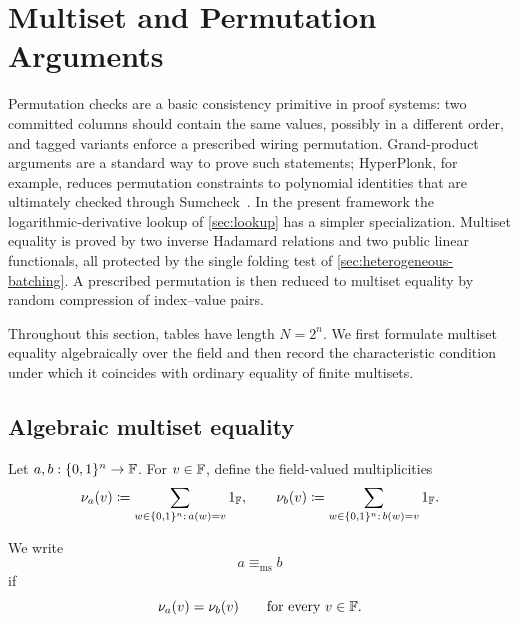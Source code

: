 \section{Multiset and Permutation Arguments}
\label{sec:permutation}

Permutation checks are a basic consistency primitive in proof systems: two committed columns should contain the same values, possibly in a different order, and tagged variants enforce a prescribed wiring permutation.  Grand-product arguments are a standard way to prove such statements; HyperPlonk, for example, reduces permutation constraints to polynomial identities that are ultimately checked through Sumcheck~\cite{HyperPlonk23}.  In the present framework the logarithmic-derivative lookup of \cref{sec:lookup} has a simpler specialization.  Multiset equality is proved by two inverse Hadamard relations and two public linear functionals, all protected by the single folding test of \cref{sec:heterogeneous-batching}.  A prescribed permutation is then reduced to multiset equality by random compression of index--value pairs.

Throughout this section, tables have length $N=2^n$.  We first formulate multiset equality algebraically over the field and then record the characteristic condition under which it coincides with ordinary equality of finite multisets.

\subsection{Algebraic multiset equality}
\label{sec:algebraic-multiset}

Let $a,b:\{0,1\}^n\to\mathbb{F}$.  For $v\in\mathbb{F}$, define the field-valued multiplicities
\begin{equation}
  \nu_a(v)\coloneqq
  \sum_{w\in\{0,1\}^n:\,a(w)=v}1_{\mathbb{F}},
  \qquad
  \nu_b(v)\coloneqq
  \sum_{w\in\{0,1\}^n:\,b(w)=v}1_{\mathbb{F}}.
  \label{eq:multiset-field-multiplicities}
\end{equation}

\begin{definition}
\label{def:algebraic-multiset-equality}
We write
\begin{equation}
  a\equiv_{\mathrm{ms}} b
  \label{eq:algebraic-multiset-equality}
\end{equation}
if
\begin{equation}
  \nu_a(v)=\nu_b(v)
  \qquad\text{for every }v\in\mathbb{F}.
  \label{eq:multiset-multiplicity-equality}
\end{equation}
\end{definition}


